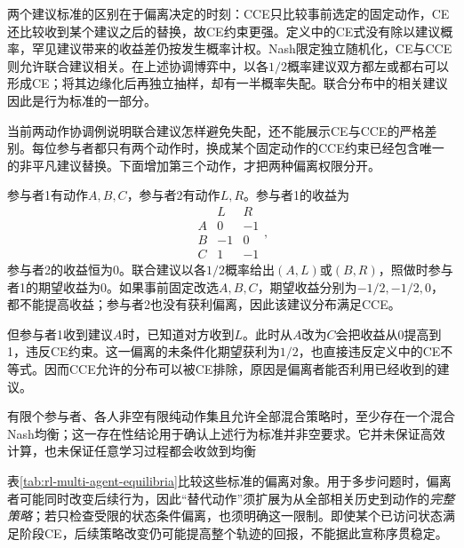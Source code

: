 两个建议标准的区别在于偏离决定的时刻：CCE只比较事前选定的固定动作，CE还比较收到某个建议之后的替换，故CE约束更强。定义中的CE式没有除以建议概率，罕见建议带来的收益差仍按发生概率计权。Nash限定独立随机化，CE与CCE则允许联合建议相关。在上述协调博弈中，以各$1/2$概率建议双方都左或都右可以形成CE；将其边缘化后再独立抽样，却有一半概率失配。联合分布中的相关建议因此是行为标准的一部分。

当前两动作协调例说明联合建议怎样避免失配，还不能展示CE与CCE的严格差别。每位参与者都只有两个动作时，换成某个固定动作的CCE约束已经包含唯一的非平凡建议替换。下面增加第三个动作，才把两种偏离权限分开。

\begin{example}[事前固定偏离与收到建议后的偏离]
  \label{ex:rl-multi-agent-ce-cce}
  参与者1有动作$A,B,C$，参与者2有动作$L,R$。参与者1的收益为
  \[
    \begin{array}{c|rr}
          &L&R\\ \hline
      A& 0&-1\\
      B&-1& 0\\
      C& 1&-1
    \end{array},
  \]
  参与者2的收益恒为0。联合建议以各$1/2$概率给出$(A,L)$或$(B,R)$，照做时参与者1的期望收益为0。如果事前固定改选$A,B,C$，期望收益分别为$-1/2,-1/2,0$，都不能提高收益；参与者2也没有获利偏离，因此该建议分布满足CCE。

  但参与者1收到建议$A$时，已知道对方收到$L$。此时从$A$改为$C$会把收益从0提高到1，违反CE约束。这一偏离的未条件化期望获利为$1/2$，也直接违反定义中的CE不等式。因而CCE允许的分布可以被CE排除，原因是偏离者能否利用已经收到的建议。
\end{example}

有限个参与者、各人非空有限纯动作集且允许全部混合策略时，至少存在一个混合Nash均衡；这一存在性结论用于确认上述行为标准并非空要求。它并未保证高效计算，也未保证任意学习过程都会收敛到均衡

表\ref{tab:rl-multi-agent-equilibria}比较这些标准的偏离对象。用于多步问题时，偏离者可能同时改变后续行为，因此“替代动作”须扩展为从全部相关历史到动作的\emph{完整策略}；若只检查受限的状态条件偏离，也须明确这一限制。即使某个已访问状态满足阶段CE，后续策略改变仍可能提高整个轨迹的回报，不能据此宣称序贯稳定。

